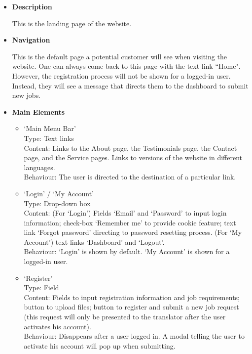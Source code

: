 \documentclass{l3proj}
\begin{document}
\begin{itemize}
\item \textbf{Description}

This is the landing page of the website. 

\item \textbf{Navigation}

This is the default page a potential customer will see when visiting the website. One can always come back to this page with the text link ``Home".
However, the registration process will not be shown for a logged-in user. Instead, they will see a message that directs them to the dashboard to submit new jobs.

\item \textbf{Main Elements}
\begin{itemize}
\item `Main Menu Bar'\\
Type: Text links\\
Content: Links to the About page, the Testimonials page, the Contact page, and the Service pages. Links to versions of the website in different languages. \\
Behaviour: The user is directed to the destination of a particular link. \\

\item `Login' / `My Account'\\
Type: Drop-down box\\
Content: (For `Login') Fields `Email' and `Password' to input login information; check-box `Remember me' to provide cookie feature; 
text link `Forgot password' directing to password resetting process. (For `My Account') text links `Dashboard' and `Logout'.\\
Behaviour: `Login' is shown by default. `My Account' is shown for a logged-in user.\\

\item `Register'\\
Type: Field\\
Content: Fields to input registration information and job requirements; button to upload files; 
button to register and submit a new job request (this request will only be presented to the translator after the user activates his account).\\
Behaviour: Disappears after a user logged in. A modal telling the user to activate his account will pop up when submitting. \\
\end{itemize}
\end{itemize}
\end{document}
